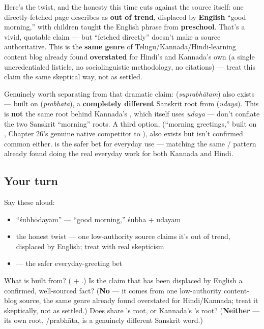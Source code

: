 \begin{culture}
Here's the twist, and the honesty this time cuts against the source itself: one directly-fetched page describes \textbf{} as \textbf{out of trend}, displaced by \textbf{English} \textquotedblleft{}good morning,\textquotedblright{} with children taught the English phrase from \textbf{preschool}. That's a vivid, quotable claim — but \textquotedblleft{}fetched directly\textquotedblright{} doesn't make a source authoritative. This is the \textbf{same genre} of Telugu/Kannada/Hindi-learning content blog already found \textbf{overstated} for Hindi's  and Kannada's own \textbf{} (a single uncredentialed listicle, no sociolinguistic methodology, no citations) — treat this claim the same skeptical way, not as settled.

Genuinely worth separating from that dramatic claim: \textbf{} (\emph{suprabhātam}) also exists — built on \textbf{} (\emph{prabhāta}), a \textbf{completely different} Sanskrit root from \textbf{} (\emph{udaya}). This is \textbf{not} the same root behind Kannada's \textbf{}, which itself uses \emph{udaya} — don't conflate the two Sanskrit \textquotedblleft{}morning\textquotedblright{} roots. A third option, \textbf{ } (\textquotedblleft{}morning greetings,\textquotedblright{} built on \textbf{}, Chapter 26's genuine native competitor to ), also exists but isn't confirmed common either. \textbf{} is the safer bet for everyday use — matching the same / pattern already found doing the real everyday work for both Kannada and Hindi.
\end{culture}

\subsection*{Your turn}
Say these aloud:

\begin{itemize}
\raggedright
  \item \textquotedblleft{}śubhōdayam\textquotedblright{} — \textquotedblleft{}good morning,\textquotedblright{} śubha + udayam
  \item the honest twist — one low-authority source claims it's out of trend, displaced by English; treat with real skepticism
  \item {} — the safer everyday-greeting bet
\end{itemize}

\begin{tcolorbox}[breakable,colback=teal!4,colframe=teal!35!black,title={Before you move on}]
What is  built from? (\textbf{} + \textbf{}.) Is the claim that  has been displaced by English a confirmed, well-sourced fact? (\textbf{No} — it comes from one low-authority content-blog source, the same genre already found overstated for Hindi/Kannada; treat it skeptically, not as settled.) Does  share 's root, or Kannada's 's root? (\textbf{Neither} — its own root, /prabhāta, is a genuinely different Sanskrit word.)
\end{tcolorbox}
